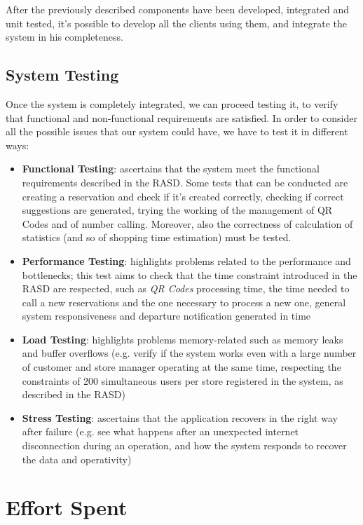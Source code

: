 \documentclass{article}
\begin{document}
		After the previously described components have been developed, integrated and unit tested, it's possible to develop all the clients using them, and integrate the system in his completeness.
		

		

	
	\subsection{System Testing}
	Once the system is completely integrated, we can proceed testing it, to verify that functional and non-functional requirements are satisfied.
	In order to consider all the possible issues that our system could have, we have to test it in different ways:
	\begin{itemize}
		\item \textbf{Functional Testing}: ascertains that the system meet the functional requirements described in the RASD. Some tests that can be conducted are creating a reservation and check if it's created correctly, checking if correct suggestions are generated, trying the working of the management of QR Codes and of number calling. Moreover, also the correctness of calculation of statistics (and so of shopping time estimation) must be tested.
		\item \textbf{Performance Testing}: highlights problems related to the performance and bottlenecks; this test aims to check that the time constraint introduced in the RASD are respected, such as \emph{QR Codes} processing time, the time needed to call a new reservations and the one necessary to process a new one, general system responsiveness and departure notification generated in time
		\item \textbf{Load Testing}: highlights problems memory-related such as memory leaks and buffer overflows (e.g. verify if the system works even with a large number of customer and store manager operating at the same time, respecting the constraints of 200 simultaneous users per store registered in the system, as described in the RASD)
		\item \textbf{Stress Testing}: ascertains that the application recovers in the right way after failure (e.g. see what happens after an unexpected internet disconnection during an operation, and how the system responds to recover the data and operativity)
	\end{itemize}
			
	

\section{Effort Spent}
	
\end{document}
